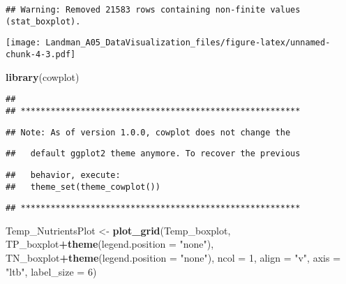 \documentclass[]{article}
\newenvironment{Shaded}{\begin{snugshade}}{\end{snugshade}}
\newcommand{\DataTypeTok}[1]{\textcolor[rgb]{0.13,0.29,0.53}{#1}}
\newcommand{\DecValTok}[1]{\textcolor[rgb]{0.00,0.00,0.81}{#1}}
\newcommand{\KeywordTok}[1]{\textcolor[rgb]{0.13,0.29,0.53}{\textbf{#1}}}
\newcommand{\NormalTok}[1]{#1}
\newcommand{\OperatorTok}[1]{\textcolor[rgb]{0.81,0.36,0.00}{\textbf{#1}}}
\newcommand{\StringTok}[1]{\textcolor[rgb]{0.31,0.60,0.02}{#1}}
\begin{document}
\begin{verbatim}
## Warning: Removed 21583 rows containing non-finite values (stat_boxplot).
\end{verbatim}

\texttt{[image: Landman\_A05\_DataVisualization\_files/figure-latex/unnamed-chunk-4-3.pdf]}

\begin{Shaded}
\begin{Highlighting}[]
\KeywordTok{library}\NormalTok{(cowplot)}
\end{Highlighting}
\end{Shaded}

\begin{verbatim}
## 
## ********************************************************
\end{verbatim}

\begin{verbatim}
## Note: As of version 1.0.0, cowplot does not change the
\end{verbatim}

\begin{verbatim}
##   default ggplot2 theme anymore. To recover the previous
\end{verbatim}

\begin{verbatim}
##   behavior, execute:
##   theme_set(theme_cowplot())
\end{verbatim}

\begin{verbatim}
## ********************************************************
\end{verbatim}

\begin{Shaded}
\begin{Highlighting}[]
\NormalTok{Temp_NutrientsPlot <-}\StringTok{ }
\StringTok{  }\KeywordTok{plot_grid}\NormalTok{(Temp_boxplot, TP_boxplot}\OperatorTok{+}\KeywordTok{theme}\NormalTok{(}\DataTypeTok{legend.position =} \StringTok{"none"}\NormalTok{), }
\NormalTok{            TN_boxplot}\OperatorTok{+}\KeywordTok{theme}\NormalTok{(}\DataTypeTok{legend.position =} \StringTok{"none"}\NormalTok{), }
            \DataTypeTok{ncol =} \DecValTok{1}\NormalTok{, }\DataTypeTok{align =} \StringTok{"v"}\NormalTok{, }\DataTypeTok{axis =} \StringTok{"ltb"}\NormalTok{, }\DataTypeTok{label_size =} \DecValTok{6}\NormalTok{)}
\end{Highlighting}
\end{Shaded}
\end{document}
